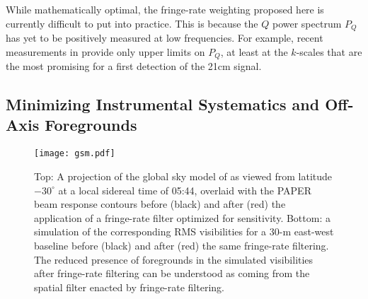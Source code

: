 \documentclass[twocolumn,apj,numberedappendix]{emulateapj}
\begin{document}
While mathematically optimal, the fringe-rate weighting proposed here is currently difficult
to put into practice. This is because the $Q$ power spectrum $P_Q$ has yet to be positively
measured at low frequencies. For example, recent measurements in \citet{moore_et_al2015}
provide only upper limits on $P_Q$, at least at the $k$-scales that are the
most promising for a first detection of the 21cm signal.
%
%


\subsection{Minimizing Instrumental Systematics and Off-Axis Foregrounds}
\label{sec:foregrounds}

\begin{figure}\centering
\texttt{[image: gsm.pdf]}
\caption{
Top: A projection of the global sky model of \citet{deoliveiracosta_et_al2008} as viewed from
latitude $-30^\circ$ at a local sidereal time of 05:44, overlaid with the 
PAPER beam response contours before (black) and after (red) the application of a fringe-rate filter
optimized for sensitivity.  
Bottom: a simulation of the corresponding RMS visibilities for a 30-m east-west baseline before (black) and
after (red) the same fringe-rate filtering.
The reduced presence of foregrounds in the simulated visibilities after fringe-rate filtering
can be understood as coming from the spatial filter enacted by fringe-rate filtering.
}\label{fig:gsm}
\end{figure}
\end{document}
